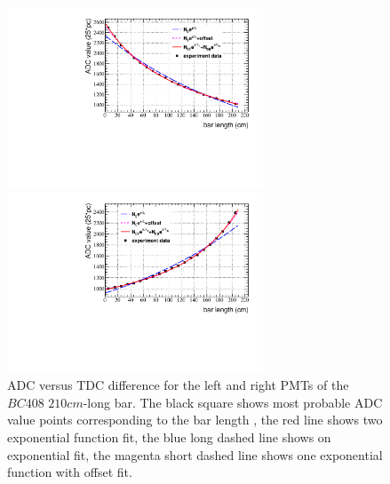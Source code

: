 \begin{figure}[h!]
\begin{minipage}[h]{0.5\linewidth}
\centering
\includegraphics[width=3in]{ye/fig_ye_scintillator/c1_TL.pdf}
\end{minipage}%
\begin{minipage}[h]{0.5\linewidth}
\centering
\includegraphics[width=3in]{ye/fig_ye_scintillator/c1_TR.pdf}
\end{minipage}

\caption{ADC versus TDC difference for the left and right PMTs of the $BC408$ $210 cm$-long bar. The black square shows most probable ADC value points corresponding to the bar length , the red line shows two exponential function fit, the blue long dashed line shows on exponential fit, the magenta short dashed line shows one exponential function with offset fit.}
\label{f:expo}
\end{figure}


